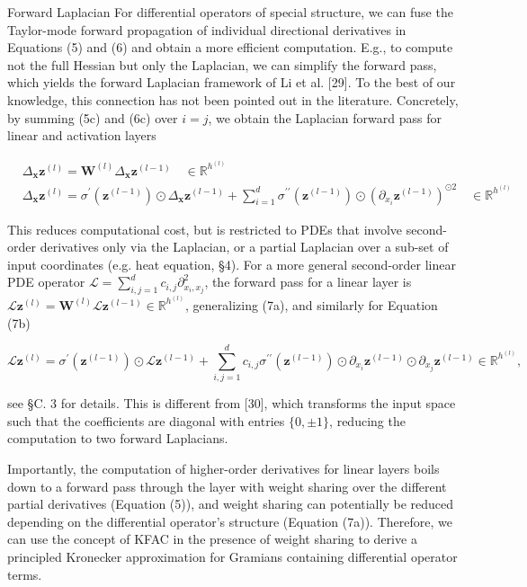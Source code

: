 \documentclass[10pt]{article}
\begin{document}
Forward Laplacian For differential operators of special structure, we can fuse the Taylor-mode forward propagation of individual directional derivatives in Equations (5) and (6) and obtain a more efficient computation. E.g., to compute not the full Hessian but only the Laplacian, we can simplify the forward pass, which yields the forward Laplacian framework of Li et al. [29]. To the best of our knowledge, this connection has not been pointed out in the literature. Concretely, by summing (5c) and (6c) over $i=j$, we obtain the Laplacian forward pass for linear and activation layers


\begin{align*}
& \Delta_{\boldsymbol{x}} \boldsymbol{z}^{(l)}=\boldsymbol{W}^{(l)} \Delta_{\boldsymbol{x}} \boldsymbol{z}^{(l-1)} \quad \in \mathbb{R}^{h^{(l)}}  \tag{7a}\\
& \Delta_{\boldsymbol{x}} \boldsymbol{z}^{(l)}=\sigma^{\prime}\left(\boldsymbol{z}^{(l-1)}\right) \odot \Delta_{\boldsymbol{x}} \boldsymbol{z}^{(l-1)}+\sum_{i=1}^{d} \sigma^{\prime \prime}\left(\boldsymbol{z}^{(l-1)}\right) \odot\left(\partial_{x_{i}} \boldsymbol{z}^{(l-1)}\right)^{\odot 2} \quad \in \mathbb{R}^{h^{(l)}} \tag{7b}
\end{align*}


This reduces computational cost, but is restricted to PDEs that involve second-order derivatives only via the Laplacian, or a partial Laplacian over a sub-set of input coordinates (e.g. heat equation, §4). For a more general second-order linear PDE operator $\mathcal{L}=\sum_{i, j=1}^{d} c_{i, j} \partial_{x_{i}, x_{j}}^{2}$, the forward pass for a linear layer is $\mathcal{L} \boldsymbol{z}^{(l)}=\boldsymbol{W}^{(l)} \mathcal{L} \boldsymbol{z}^{(l-1)} \in \mathbb{R}^{h^{(l)}}$, generalizing (7a), and similarly for Equation (7b)

$$
\mathcal{L} \boldsymbol{z}^{(l)}=\sigma^{\prime}\left(\boldsymbol{z}^{(l-1)}\right) \odot \mathcal{L} \boldsymbol{z}^{(l-1)}+\sum_{i, j=1}^{d} c_{i, j} \sigma^{\prime \prime}\left(\boldsymbol{z}^{(l-1)}\right) \odot \partial_{x_{i}} \boldsymbol{z}^{(l-1)} \odot \partial_{x_{j}} \boldsymbol{z}^{(l-1)} \in \mathbb{R}^{h^{(l)}},
$$

see §C. 3 for details. This is different from [30], which transforms the input space such that the coefficients are diagonal with entries $\{0, \pm 1\}$, reducing the computation to two forward Laplacians.

Importantly, the computation of higher-order derivatives for linear layers boils down to a forward pass through the layer with weight sharing over the different partial derivatives (Equation (5)), and weight sharing can potentially be reduced depending on the differential operator's structure (Equation (7a)). Therefore, we can use the concept of KFAC in the presence of weight sharing to derive a principled Kronecker approximation for Gramians containing differential operator terms.
\end{document}
